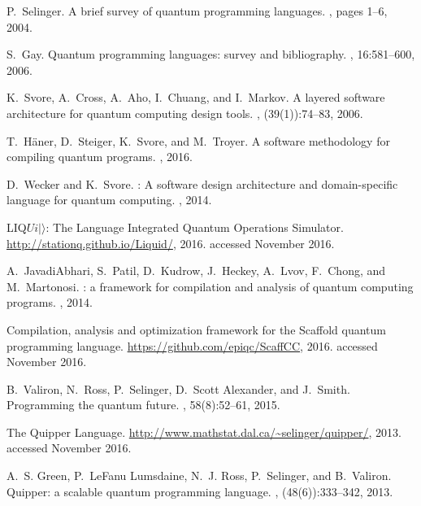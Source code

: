 \documentclass[USenglish,12pt,fleqn]{article} %
\begin{document}
\begin{thebibliography}{10}

P.~Selinger.
\newblock A brief survey of quantum programming languages.
,
  pages 1--6, 2004.

S.~Gay.
\newblock Quantum programming languages: survey and bibliography.
, 16:581--600, 2006.

K.~Svore, A.~Cross, A.~Aho, I.~Chuang, and I.~Markov.
\newblock A layered software architecture for quantum computing design tools.
, (39(1)):74--83, 2006.

T.~H\"aner, D.~Steiger, K.~Svore, and M.~Troyer.
\newblock A software methodology for compiling quantum programs.
, 2016.

D.~Wecker and K.~Svore.
: A software design architecture and domain-specific
  language for quantum computing.
, 2014.

{LIQ$Ui|\rangle$}: {T}he {L}anguage {I}ntegrated {Q}uantum {O}perations
  {S}imulator.
\newblock \url{http://stationq.github.io/Liquid/}, 2016.
\newblock accessed November 2016.

A.~JavadiAbhari, S.~Patil, D.~Kudrow, J.~Heckey, A.~Lvov, F.~Chong, and
  M.~Martonosi.
: a framework for compilation and analysis of quantum
  computing programs.
,
  2014.

Compilation, analysis and optimization framework for the {S}caffold quantum
  programming language.
\newblock \url{https://github.com/epiqc/ScaffCC}, 2016.
\newblock accessed November 2016.

B.~Valiron, N.~Ross, P.~Selinger, D.~Scott Alexander, and J.~Smith.
\newblock Programming the quantum future.
, 58(8):52--61, 2015.

The {Q}uipper {L}anguage.
\newblock \url{http://www.mathstat.dal.ca/~selinger/quipper/}, 2013.
\newblock accessed November 2016.

A.~S. Green, P.~LeFanu Lumsdaine, N.~J. Ross, P.~Selinger, and B.~Valiron.
\newblock Quipper: a scalable quantum programming language.
, (48(6)):333--342, 2013.


\end{thebibliography}
\end{document}
